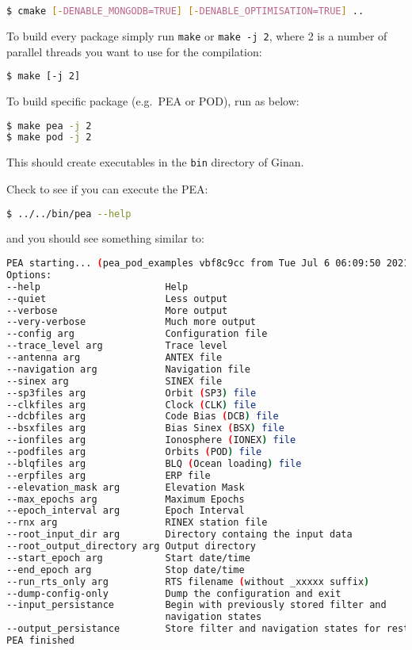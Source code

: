\begin{lstlisting}[language=bash]
$ cmake [-DENABLE_MONGODB=TRUE] [-DENABLE_OPTIMISATION=TRUE] ..
\end{lstlisting}

To build every package simply run \texttt{make} or \texttt{make\ -j\ 2},
where 2 is a number of parallel threads you want to use for the
compilation:

\begin{lstlisting}[language=bash]
$ make [-j 2]
\end{lstlisting}

To build specific package (e.g.~PEA or POD), run as below:

\begin{lstlisting}[language=bash]
$ make pea -j 2
$ make pod -j 2
\end{lstlisting}

This should create executables in the \texttt{bin} directory of Ginan.

Check to see if you can execute the PEA:

\begin{lstlisting}[language=bash]
$ ../../bin/pea --help
\end{lstlisting}

and you should see something similar to:

\begin{lstlisting}[language=bash]
PEA starting... (pea_pod_examples vbf8c9cc from Tue Jul 6 06:09:50 2021)
Options:
--help                      Help
--quiet                     Less output
--verbose                   More output
--very-verbose              Much more output
--config arg                Configuration file
--trace_level arg           Trace level
--antenna arg               ANTEX file
--navigation arg            Navigation file
--sinex arg                 SINEX file
--sp3files arg              Orbit (SP3) file
--clkfiles arg              Clock (CLK) file
--dcbfiles arg              Code Bias (DCB) file
--bsxfiles arg              Bias Sinex (BSX) file
--ionfiles arg              Ionosphere (IONEX) file
--podfiles arg              Orbits (POD) file
--blqfiles arg              BLQ (Ocean loading) file
--erpfiles arg              ERP file
--elevation_mask arg        Elevation Mask
--max_epochs arg            Maximum Epochs
--epoch_interval arg        Epoch Interval
--rnx arg                   RINEX station file
--root_input_dir arg        Directory containg the input data
--root_output_directory arg Output directory
--start_epoch arg           Start date/time
--end_epoch arg             Stop date/time
--run_rts_only arg          RTS filename (without _xxxxx suffix)
--dump-config-only          Dump the configuration and exit
--input_persistance         Begin with previously stored filter and 
                            navigation states
--output_persistance        Store filter and navigation states for restarting
PEA finished
\end{lstlisting}

